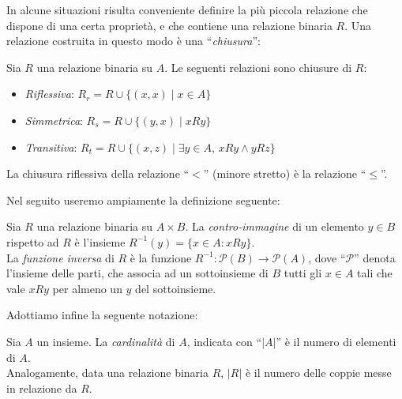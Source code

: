 In alcune situazioni risulta conveniente definire la più piccola relazione che dispone di una certa proprietà, e che contiene una relazione binaria $R$. Una relazione costruita in questo modo è una ``\emph{chiusura}'':
\begin{definition}
	Sia $R$ una relazione binaria su $A$. Le seguenti relazioni sono chiusure di $R$:
    \begin{itemize}
        \item \emph{Riflessiva}: $R_r = R \cup \{(x,x) \mid x \in A\}$
        \item \emph{Simmetrica}: $R_s = R \cup \{(y,x) \mid x R y\}$
        \item \emph{Transitiva}: $R_t = R \cup \{(x,z) \mid \exists y \in A,\, x R y \land y R z\}$
    \end{itemize}
\end{definition}
\begin{example}
    La chiusura riflessiva della relazione ``$<$'' (minore stretto) è la relazione ``$\leq$''.
\end{example}
Nel seguito useremo ampiamente la definizione seguente:
\begin{definition}
    Sia $R$ una relazione binaria su $A \times B$. La \emph{contro-immagine} di un elemento $y \in B$ rispetto ad $R$ è l'insieme $R^{-1}(y) = \{x \in A : x R y\}$.\\
    La \emph{funzione inversa} di $R$ è la funzione $R^{-1} : \mathcal{P}(B) \to \mathcal{P}(A)$, dove ``$\mathcal{P}$'' denota l'insieme delle parti, che associa ad un sottoinsieme di $B$ tutti gli $x \in A$ tali che vale $x R y$ per almeno un $y$ del sottoinsieme.
\end{definition}
Adottiamo infine la seguente notazione:
\begin{definition}
    Sia $A$ un insieme. La \emph{cardinalità} di $A$, indicata con ``$|A|$'' è il numero di elementi di $A$.\\
    Analogamente, data una relazione binaria $R$, $|R|$ è il numero delle coppie messe in relazione da $R$.
\end{definition}

